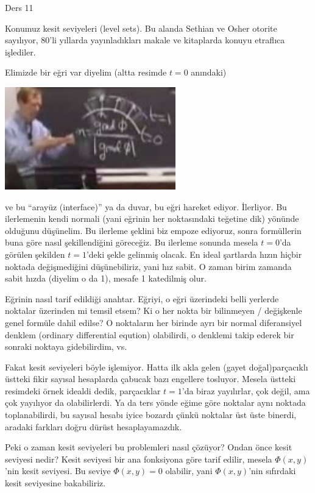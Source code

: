 \documentclass[12pt,fleqn]{article}\usepackage{../../common}
\begin{document}
Ders 11

Konumuz kesit seviyeleri (level sets). Bu alanda Sethian ve Osher otorite
sayılıyor, 80'li yıllarda yayınladıkları makale ve kitaplarda konuyu etraflıca
işlediler.

Elimizde bir eğri var diyelim (altta resimde $t=0$ anındaki)

\includegraphics[width=20em]{2_11_01.jpg}

ve bu ``arayüz (interface)'' ya da duvar, bu eğri hareket ediyor. İlerliyor. Bu
ilerlemenin kendi normali (yani eğrinin her noktasındaki teğetine dik) yönünde
olduğunu düşünelim. Bu ilerleme şeklini biz empoze ediyoruz, sonra formüllerin
buna göre nasıl şekillendiğini göreceğiz. Bu ilerleme sonunda mesela $t=0$'da
görülen şekilden $t=1$'deki şekle gelinmiş olacak. En ideal şartlarda hızın
hiçbir noktada değişmediğini düşünebiliriz, yani hız sabit. O zaman birim
zamanda sabit hızda (diyelim o da 1), mesafe 1 katedilmiş olur.

Eğrinin nasıl tarif edildiği anahtar. Eğriyi, o eğri üzerindeki belli yerlerde
noktalar üzerinden mi temsil etsem? Ki o her nokta bir bilinmeyen / değişkenle
genel formüle dahil edilse? O noktaların her birinde ayrı bir normal
diferansiyel denklem (ordinary differential eqution) olabilirdi, o denklemi
takip ederek bir sonraki noktaya gidebilirdim, vs. 

Fakat kesit seviyeleri böyle işlemiyor. Hatta ilk akla gelen (gayet
doğal)parçacıklı üstteki fikir sayısal hesaplarda çabucak bazı engellere
tosluyor. Mesela üstteki resimdeki örnek idealdi dedik, parçacıklar $t=1$'da
biraz yayılırlar, çok değil, ama çok yayılıyor da olabilirlerdi. Ya da ters
yönde eğime göre noktalar aynı noktada toplanabilirdi, bu sayısal hesabı iyice
bozardı çünkü noktalar üst üste binerdi, aradaki farkları doğru dürüst
hesaplayamazdık.

Peki o zaman kesit seviyeleri bu problemleri nasıl çözüyor? Ondan önce kesit
seviyesi nedir? Kesit seviyesi bir ana fonksiyona göre tarif edilir, mesela
$\Phi(x,y)$'nin kesit seviyesi. Bu seviye $\Phi(x,y) = 0$ olabilir, yani
$\Phi(x,y)$'nin sıfırdaki kesit seviyesine bakabiliriz.
\end{document}
